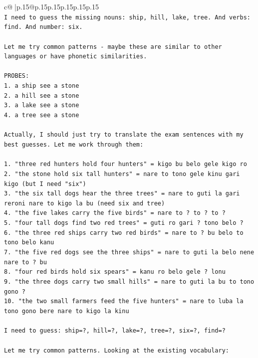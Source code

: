 \documentclass{article}
\begin{document}
{\begin{supertabular}{c@{$\;$}|p{.15\linewidth}@{}p{.15\linewidth}p{.15\linewidth}p{.15\linewidth}p{.15\linewidth}p{.15\linewidth}}
{{{\\ 
\texttt{I need to guess the missing nouns: ship, hill, lake, tree. And verbs: find. And number: six.} \\
\\ 
\texttt{Let me try common patterns {-} maybe these are similar to other languages or have phonetic similarities.} \\
\\ 
\texttt{PROBES:} \\
\texttt{1. a ship see a stone} \\
\texttt{2. a hill see a stone} \\
\texttt{3. a lake see a stone} \\
\texttt{4. a tree see a stone} \\
\\ 
\texttt{Actually, I should just try to translate the exam sentences with my best guesses. Let me work through them:} \\
\\ 
\texttt{1. "three red hunters hold four hunters" = kigo bu belo gele kigo ro} \\
\texttt{2. "the stone hold six tall hunters" = nare to tono gele kinu gari kigo (but I need "six")} \\
\texttt{3. "the six tall dogs hear the three trees" = nare to guti la gari reroni nare to kigo la bu (need six and tree)} \\
\texttt{4. "the five lakes carry the five birds" = nare to ? to ? to ?} \\
\texttt{5. "four tall dogs find two red trees" = guti ro gari ? tono belo ?} \\
\texttt{6. "the three red ships carry two red birds" = nare to ? bu belo to tono belo kanu} \\
\texttt{7. "the five red dogs see the three ships" = nare to guti la belo nene nare to ? bu} \\
\texttt{8. "four red birds hold six spears" = kanu ro belo gele ? lonu} \\
\texttt{9. "the three dogs carry two small hills" = nare to guti la bu to tono gono ?} \\
\texttt{10. "the two small farmers feed the five hunters" = nare to luba la tono gono bere nare to kigo la kinu} \\
\\ 
\texttt{I need to guess: ship=?, hill=?, lake=?, tree=?, six=?, find=?} \\
\\ 
\texttt{Let me try common patterns. Looking at the existing vocabulary:} \\
}}}
\end{supertabular}}
\end{document}
